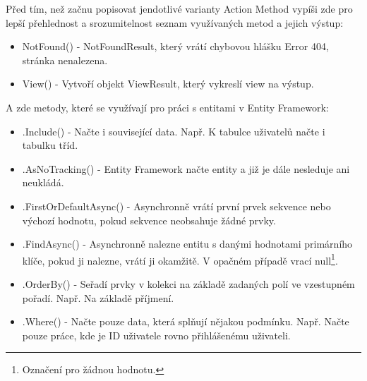 \documentclass[a4paper, 12pt]{report}
\begin{document}
	Před tím, než začnu popisovat jendotlivé varianty Action Method vypíši zde pro lepší přehlednost a srozumitelnost seznam využívaných metod a jejich výstup:
	\begin{itemize}
		\item NotFound() - NotFoundResult, který vrátí chybovou hlášku Error 404, stránka nenalezena.
		\item View() - Vytvoří objekt ViewResult, který vykreslí view na výstup.
	\end{itemize}
	A zde metody, které se využívají pro práci s entitami v Entity Framework:
	\begin{itemize}
		\item .Include() - Načte i související data. Např. K tabulce uživatelů načte i tabulku tříd.
		\item .AsNoTracking() - Entity Framework načte entity a již je dále nesleduje ani neukládá.
		\item .FirstOrDefaultAsync() - Asynchronně vrátí první prvek sekvence nebo výchozí hodnotu, pokud sekvence neobsahuje žádné prvky.
		\item .FindAsync() - Asynchronně nalezne entitu s danými hodnotami primárního klíče, pokud ji nalezne, vrátí ji okamžitě. V opačném případě vrací null\footnote{Označení pro žádnou hodnotu.}.
		\item .OrderBy() - Seřadí prvky v kolekci na základě zadaných polí ve vzestupném pořadí. Např. Na základě příjmení.
		\item .Where() - Načte pouze data, která splňují nějakou podmínku. Např. Načte pouze práce, kde je ID uživatele rovno přihlášenému uživateli.
	\end{itemize}
\end{document}
